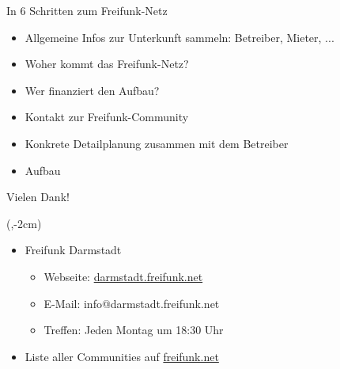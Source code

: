 \documentclass[t]{beamer}
\begin{document}
  \begin{frame}{In 6 Schritten zum Freifunk-Netz}
    \begin{itemize}
      \pause
      \item Allgemeine Infos zur Unterkunft sammeln: Betreiber, Mieter, ...
      \pause
      \item Woher kommt das Freifunk-Netz?
      \pause
      \item Wer finanziert den Aufbau?
      \pause
      \item Kontakt zur Freifunk-Community
      \pause
      \item Konkrete Detailplanung zusammen mit dem Betreiber
      \pause
      \item Aufbau
    \end{itemize}
  \end{frame}


  \begin{frame}{Vielen Dank!}
    \begin{textblock*}{0cm}(\textwidth-2cm,-2cm)
      \begin{figure}[h]
        \def\svgwidth{2.5cm}
        
      \end{figure}
    \end{textblock*}
    \begin{itemize}
      \item Freifunk Darmstadt
      \begin{itemize}
        \item Webseite: \href{http://darmstadt.freifunk.net/}{darmstadt.freifunk.net}
        \item E-Mail: info@darmstadt.freifunk.net
        \item Treffen: Jeden Montag um 18:30 Uhr
      \end{itemize}
      \vspace{1em}
      \item Liste aller Communities auf \href{https://freifunk.net/}{freifunk.net}
    \end{itemize}
  \end{frame}
\end{document}
